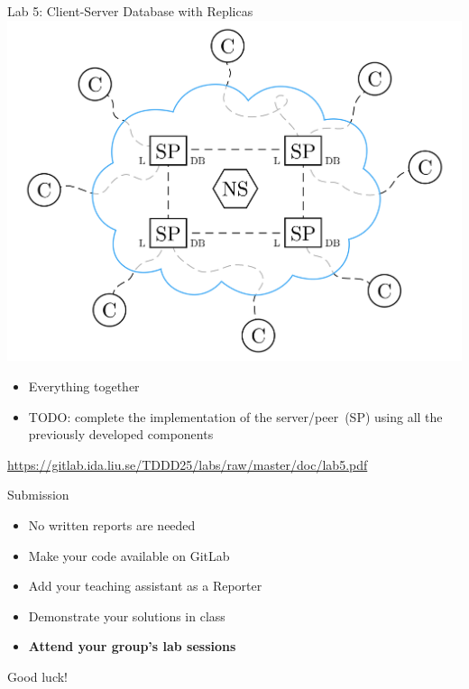 \documentclass[compress,xcolor=table]{beamer}
\begin{document}
\begin{frame}{Lab 5: Client-Server Database with Replicas}
  \centering
  \includegraphics[scale=0.10,page=1]{include/assets/distributed-database}
  \begin{itemize}
    \item Everything together
    \item \alert{TODO}: complete the implementation of the server/peer~(SP)
    using all the previously developed components
  \end{itemize}
  \begin{center}
    \scriptsize \url{https://gitlab.ida.liu.se/TDDD25/labs/raw/master/doc/lab5.pdf}
  \end{center}
\end{frame}

\begin{frame}{Submission}
  \centering
  \begin{itemize}
    \item No written reports are needed
    \item Make your code available on GitLab
    \item Add your teaching assistant as a Reporter
    \item Demonstrate your solutions in class
    \item \textbf{Attend your group's lab sessions}
  \end{itemize}
\end{frame}

\begin{frame}
  \vspace{3em}
  \begin{center}
    {\huge Good luck!}
  \end{center}
\end{frame}
\end{document}

